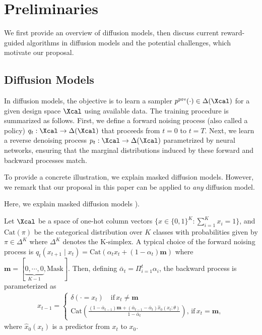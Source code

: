 

\section{Preliminaries}

We first provide an overview of diffusion models, then discuss current reward-guided algorithms in diffusion models and the potential challenges, which motivate our proposal. 


\subsection{Diffusion Models}\label{sec:diffusoin_models}

In diffusion models, the objective is to learn a sampler $p^{\pre}(\cdot) \in \Delta(\Xcal)$ for a given design space $\Xcal$ using available data. The training procedure is summarized as follows. First, we define a forward noising process (also called a policy) $q_t: \Xcal \to \Delta(\Xcal)$ that proceeds from $t=0$ to $t=T$. Next, we learn a reverse denoising process $p_t:\Xcal \to \Delta(\Xcal)$ parametrized by neural networks, ensuring that the marginal distributions induced by these forward and backward processes match.

To provide a concrete illustration, we explain masked diffusion models. However, we remark that our proposal in this paper can be applied to \emph{any} diffusion model.

\begin{example}\label{exa:masked}
    Here, we explain masked diffusion models \citep{sahoo2024simple, shi2024simplified,austin2021structured,campbell2022continuous,lou2023discrete}).

Let $\Xcal$ be a space of one-hot column vectors $\{x\in\{0,1\}^K:\sum_{i=1}^K x_i =1\}$, and $\mathrm{Cat}(\pi)$ be the categorical distribution over $K$ classes with probabilities given by $\pi \in \Delta^K$ where $\Delta^K$ denotes the K-simplex. A typical choice of the forward noising process is  
$q_t(x_{t+1}\mid x_{t}) = \mathrm{Cat}(\alpha_t x_{t}+ (1- \alpha_t)\mathbf{m} )$
where $\textstyle \mathbf{m}=[\underbrace{0,\cdots,0}_{K-1},\mathrm{Mask}]$. Then, defining $\bar{\alpha}_t = \Pi_{i=1}^t \alpha_i$, the backward process is parameterized as
\begin{align*}
\textstyle x_{t-1}=
   \begin{cases}  
     \delta(\cdot = x_t) \quad \mathrm{if}\, x_t\neq \mathbf{m}  \\
       \mathrm{Cat}\left ( \frac{(1-\bar \alpha_{t-1})\mathbf{m}  + (\bar \alpha_{t-1}- \bar \alpha_t) \hat x_0(x_t;\theta) }{ 1 - \bar \alpha_t } \right),\,\mathrm{if}\,x_t= \mathbf{m}, 
   \end{cases}  
\end{align*}
where $\hat x_0(x_t)$ is a predictor from $x_t$ to $x_0$. 

\end{example}


